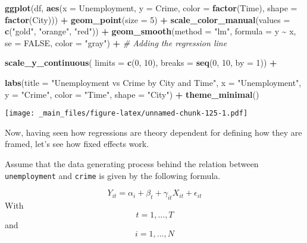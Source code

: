 \documentclass[
]{book}
\newenvironment{Shaded}{\begin{snugshade}}{\end{snugshade}}
\newcommand{\AttributeTok}[1]{\textcolor[rgb]{0.13,0.29,0.53}{#1}}
\newcommand{\CommentTok}[1]{\textcolor[rgb]{0.56,0.35,0.01}{\textit{#1}}}
\newcommand{\ConstantTok}[1]{\textcolor[rgb]{0.56,0.35,0.01}{#1}}
\newcommand{\DecValTok}[1]{\textcolor[rgb]{0.00,0.00,0.81}{#1}}
\newcommand{\FunctionTok}[1]{\textcolor[rgb]{0.13,0.29,0.53}{\textbf{#1}}}
\newcommand{\NormalTok}[1]{#1}
\newcommand{\SpecialCharTok}[1]{\textcolor[rgb]{0.81,0.36,0.00}{\textbf{#1}}}
\newcommand{\StringTok}[1]{\textcolor[rgb]{0.31,0.60,0.02}{#1}}
\begin{document}
\begin{Shaded}
\begin{Highlighting}[]
\FunctionTok{ggplot}\NormalTok{(df, }\FunctionTok{aes}\NormalTok{(}\AttributeTok{x =}\NormalTok{ Unemployment, }\AttributeTok{y =}\NormalTok{ Crime, }\AttributeTok{color =} \FunctionTok{factor}\NormalTok{(Time), }\AttributeTok{shape =} \FunctionTok{factor}\NormalTok{(City))) }\SpecialCharTok{+}
  \FunctionTok{geom\_point}\NormalTok{(}\AttributeTok{size =} \DecValTok{5}\NormalTok{) }\SpecialCharTok{+}
  \FunctionTok{scale\_color\_manual}\NormalTok{(}\AttributeTok{values =} \FunctionTok{c}\NormalTok{(}\StringTok{"gold"}\NormalTok{, }\StringTok{"orange"}\NormalTok{, }\StringTok{"red"}\NormalTok{)) }\SpecialCharTok{+}
  \FunctionTok{geom\_smooth}\NormalTok{(}\AttributeTok{method =} \StringTok{"lm"}\NormalTok{, }\AttributeTok{formula =}\NormalTok{ y }\SpecialCharTok{\textasciitilde{}}\NormalTok{ x, }\AttributeTok{se =} \ConstantTok{FALSE}\NormalTok{, }\AttributeTok{color =} \StringTok{"gray"}\NormalTok{) }\SpecialCharTok{+}  \CommentTok{\# Adding the regression line}

  \FunctionTok{scale\_y\_continuous}\NormalTok{(}
  \AttributeTok{limits =} \FunctionTok{c}\NormalTok{(}\DecValTok{0}\NormalTok{, }\DecValTok{10}\NormalTok{),}
  \AttributeTok{breaks =} \FunctionTok{seq}\NormalTok{(}\DecValTok{0}\NormalTok{, }\DecValTok{10}\NormalTok{, }\AttributeTok{by =} \DecValTok{1}\NormalTok{)) }\SpecialCharTok{+}
  
  \FunctionTok{labs}\NormalTok{(}\AttributeTok{title =} \StringTok{"Unemployment vs Crime by City and Time"}\NormalTok{,}
       \AttributeTok{x =} \StringTok{"Unemployment"}\NormalTok{,}
       \AttributeTok{y =} \StringTok{"Crime"}\NormalTok{,}
       \AttributeTok{color =} \StringTok{"Time"}\NormalTok{,}
       \AttributeTok{shape =} \StringTok{"City"}\NormalTok{) }\SpecialCharTok{+}
  \FunctionTok{theme\_minimal}\NormalTok{()}
\end{Highlighting}
\end{Shaded}

\texttt{[image: \_main\_files/figure-latex/unnamed-chunk-125-1.pdf]}

Now, having seen how regressions are theory dependent for defining how they are framed, let's see how fixed effects work.

Assume that the data generating process behind the relation between \texttt{unemployment} and \texttt{crime} is given by the following formula.

\[Y_{it}=\alpha_{i}+\beta_{t}+\gamma_{it}X_{it}+\epsilon_{it}\]
With \[t=1, ..., T\]
and
\[i=1, ..., N\]
\end{document}
